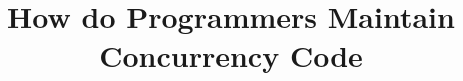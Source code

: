 \documentclass[conference]{IEEEtran}
\begin{document}
%
\title{How do Programmers Maintain Concurrency Code}


\author{
}


%
\end{document}

